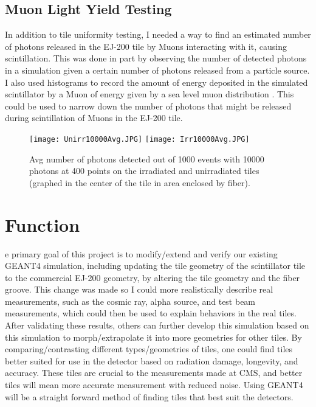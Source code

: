 \subsection{Muon Light Yield Testing}
	In addition to tile uniformity testing, I needed a way to find an estimated number of photons released in the EJ-200 tile by Muons interacting with it, causing scintillation. This was done in part by observing the number of detected photons in a simulation given a certain number of photons released from a particle source. I also used histograms to record the amount of energy deposited in the simulated scintillator by a Muon of energy given by a sea level muon distribution \cite{hlw07}. This could be used to narrow down the number of photons that might be released during scintillation of Muons in the EJ-200 tile.

\begin{figure}[h!]
  \begin{center}
    \texttt{[image: Unirr10000Avg.JPG]}
    \texttt{[image: Irr10000Avg.JPG]}
    \caption{Avg number of photons detected out of 1000 events with 10000 photons at 400 points on the irradiated and unirradiated tiles (graphed in the center of the tile in area enclosed by fiber).}
    \label{fig:4}
  \end{center}
\end{figure}

\section{Function}
e primary goal of this project is to modify/extend and verify our existing GEANT4 simulation, including updating the tile geometry of the scintillator tile to the commercial EJ-200 geometry, by altering the tile geometry and the fiber groove. This change was made so I could more realistically describe real measurements, such as the cosmic ray, alpha source, and test beam measurements, which could then be used to explain behaviors in the real tiles. After validating these results, others can further develop this simulation based on this simulation to morph/extrapolate it into more geometries for other tiles. By comparing/contrasting different types/geometries of tiles, one could find tiles better suited for use in the detector based on radiation damage, longevity, and accuracy. These tiles are crucial to the measurements made at CMS, and better tiles will mean more accurate measurement with reduced noise. Using GEANT4 will be a straight forward method of finding tiles that best suit the detectors. 

